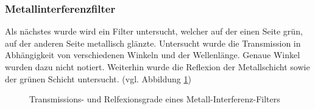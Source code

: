     \subsubsection{Metallinterferenzfilter}
        Als nächstes wurde wird ein Filter untersucht, welcher auf der einen Seite grün, auf der anderen Seite metallisch glänzte. Untersucht wurde die Transmission in Abhängigkeit von verschiedenen Winkeln und der Wellenlänge. Genaue Winkel wurden dazu nicht notiert. Weiterhin wurde die Reflexion der Metallschicht sowie der grünen Schicht untersucht. (vgl. Abbildung \ref{exp:MetInt})
        \begin{figure}
            \caption{Transmissions- und Relfexionsgrade eines Metall-Interferenz-Filters}
            \label{exp:MetInt}
        \end{figure}

